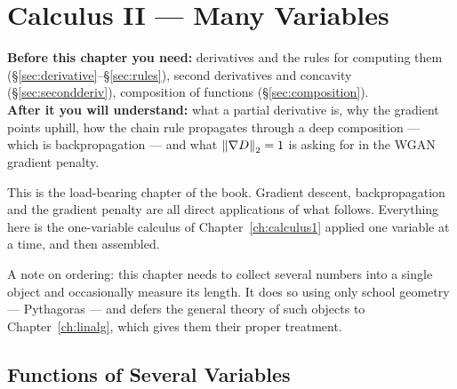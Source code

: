 \chapter{Calculus II --- Many Variables}
\label{ch:calculus2}

\begin{tcolorbox}[feynbox={Sky}{BBg},title={Before and After}]
\textbf{Before this chapter you need:} derivatives and the rules for computing
them (\S\ref{sec:derivative}--\S\ref{sec:rules}), second derivatives and
concavity (\S\ref{sec:secondderiv}), composition of functions
(\S\ref{sec:composition}).\\
\textbf{After it you will understand:} what a partial derivative is, why the
gradient points uphill, how the chain rule propagates through a deep composition
--- which is backpropagation --- and what $\left\|\nabla D\right\|_2 = 1$ is asking for
in the WGAN gradient penalty.
\end{tcolorbox}

This is the load-bearing chapter of the book. Gradient descent, backpropagation
and the gradient penalty are all direct applications of what follows. Everything
here is the one-variable calculus of Chapter~\ref{ch:calculus1} applied one
variable at a time, and then assembled.

A note on ordering: this chapter needs to collect several numbers into a single
object and occasionally measure its length. It does so using only school
geometry --- Pythagoras --- and defers the general theory of such objects to
Chapter~\ref{ch:linalg}, which gives them their proper treatment.

\section{Functions of Several Variables}
\label{sec:multivar}



